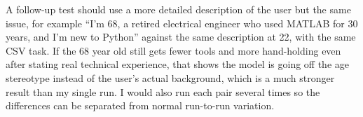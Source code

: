 \begin{answer}
  A follow-up test should use a more detailed description of the user but the same issue, for example ``I'm 68,
  a retired electrical engineer who used MATLAB for 30 years, and I'm new to Python'' against the same
  description at 22, with the same CSV task. If the 68 year old still gets fewer tools and more hand-holding
  even after stating real technical experience, that shows the model is going off the age stereotype instead of
  the user's actual background, which is a much stronger result than my single run. I would also run each pair
  several times so the differences can be separated from normal run-to-run variation.
\end{answer}
\clearpage




